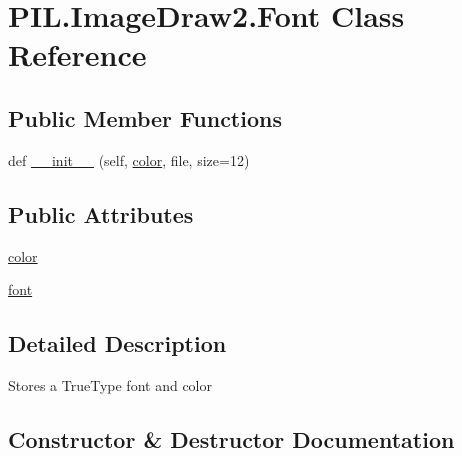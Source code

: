 \hypertarget{classPIL_1_1ImageDraw2_1_1Font}{}\section{P\+I\+L.\+Image\+Draw2.\+Font Class Reference}
\label{classPIL_1_1ImageDraw2_1_1Font}
\subsection*{Public Member Functions}
\begin{DoxyCompactItemize}
\item 
def \hyperlink{classPIL_1_1ImageDraw2_1_1Font_a30b4008bb90fb275c2f9f64c5e6f82db}{\+\_\+\+\_\+init\+\_\+\+\_\+} (self, \hyperlink{classPIL_1_1ImageDraw2_1_1Font_acdbd092533937bd189a92c943edd74a2}{color}, file, size=12)
\end{DoxyCompactItemize}
\subsection*{Public Attributes}
\begin{DoxyCompactItemize}
\item 
\hyperlink{classPIL_1_1ImageDraw2_1_1Font_acdbd092533937bd189a92c943edd74a2}{color}
\item 
\hyperlink{classPIL_1_1ImageDraw2_1_1Font_a754051f09dc98d8a4e859e233da5849d}{font}
\end{DoxyCompactItemize}


\subsection{Detailed Description}
\begin{DoxyVerb}Stores a TrueType font and color\end{DoxyVerb}
 

\subsection{Constructor \& Destructor Documentation}
\mbox{\label{classPIL_1_1ImageDraw2_1_1Font_a30b4008bb90fb275c2f9f64c5e6f82db}} 
